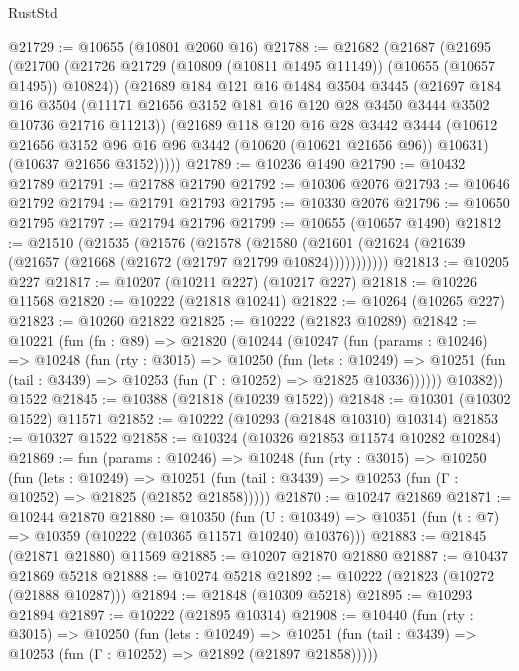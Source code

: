 \begin{lexlean}{RustStd}
\begin{coremodule}
@21729 := @10655 (@10801 @2060 @16)
@21788 := @21682
    (@21687
      (@21695
        (@21700 (@21726 @21729 (@10809 (@10811 @1495 @11149)) (@10655 (@10657 @1495)) @10824))
        (@21689
          @184
          @121
          @16
          @1484
          @3504
          @3445
          (@21697
            @184
            @16
            @3504
            (@11171 @21656 @3152 @181 @16 @120 @28 @3450 @3444 @3502 @10736 @21716 @11213))
          (@21689
            @118
            @120
            @16
            @28
            @3442
            @3444
            (@10612 @21656 @3152 @96 @16 @96 @3442 (@10620 (@10621 @21656 @96)) @10631)
            (@10637 @21656 @3152)))))
@21789 := @10236 @1490
@21790 := @10432 @21789
@21791 := @21788 @21790
@21792 := @10306 @2076
@21793 := @10646 @21792
@21794 := @21791 @21793
@21795 := @10330 @2076
@21796 := @10650 @21795
@21797 := @21794 @21796
@21799 := @10655 (@10657 @1490)
@21812 := @21510
    (@21535
      (@21576
        (@21578
          (@21580 (@21601 (@21624 (@21639 (@21657 (@21668 (@21672 (@21797 @21799 @10824)))))))))))
@21813 := @10205 @227
@21817 := @10207 (@10211 @227) (@10217 @227)
@21818 := @10226 @11568
@21820 := @10222 (@21818 @10241)
@21822 := @10264 (@10265 @227)
@21823 := @10260 @21822
@21825 := @10222 (@21823 @10289)
@21842 := @10221
    (fun (fn : @89) =>
    @21820
      (@10244
        (@10247
          (fun (params : @10246) =>
          @10248
            (fun (rty : @3015) =>
            @10250
              (fun (lets : @10249) =>
              @10251 (fun (tail : @3439) => @10253 (fun (Γ : @10252) => @21825 @10336))))))
        @10382))
    @1522
@21845 := @10388 (@21818 (@10239 @1522))
@21848 := @10301 (@10302 @1522) @11571
@21852 := @10222 (@10293 (@21848 @10310) @10314)
@21853 := @10327 @1522
@21858 := @10324 (@10326 @21853 @11574 @10282 @10284)
@21869 := fun (params : @10246) =>
  @10248
    (fun (rty : @3015) =>
    @10250
      (fun (lets : @10249) =>
      @10251 (fun (tail : @3439) => @10253 (fun (Γ : @10252) => @21825 (@21852 @21858)))))
@21870 := @10247 @21869
@21871 := @10244 @21870
@21880 := @10350
    (fun (U : @10349) => @10351 (fun (t : @7) => @10359 (@10222 (@10365 @11571 @10240) @10376)))
@21883 := @21845 (@21871 @21880) @11569
@21885 := @10207 @21870 @21880
@21887 := @10437 @21869 @5218
@21888 := @10274 @5218
@21892 := @10222 (@21823 (@10272 (@21888 @10287)))
@21894 := @21848 (@10309 @5218)
@21895 := @10293 @21894
@21897 := @10222 (@21895 @10314)
@21908 := @10440
    (fun (rty : @3015) =>
    @10250
      (fun (lets : @10249) =>
      @10251 (fun (tail : @3439) => @10253 (fun (Γ : @10252) => @21892 (@21897 @21858)))))

\end{coremodule}
\end{lexlean}
